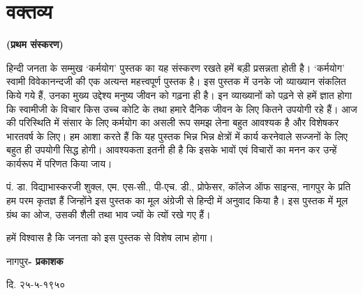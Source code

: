 
\chapter*{वक्तव्य}

\begin{center}
\textbf{(प्रथम संस्करण)}
\end{center}

हिन्दी जनता के सम्मुख ‘कर्मयोग’ पुस्तक का यह संस्करण रखते हमें बड़ी प्रसन्नता होती है। ‘कर्मयोग’ स्वामी विवेकानन्दजी की एक अत्यन्त महत्त्वपूर्ण पुस्तक है। इस पुस्तक में उनके जो व्याख्यान संकलित किये गये हैं, उनका मुख्य उद्देश्य मनुष्य जीवन को गढ़ना ही है। इन व्याख्यानों को पढ़ने से हमें ज्ञात होगा कि स्वामीजी के विचार किस उच्च कोटि के तथा हमारे दैनिक जीवन के लिए कितने उपयोगी रहे हैं। आज की परिस्थिति में संसार के लिए कर्मयोग का असली रूप समझ लेना बहुत आवश्यक है और विशेषकर भारतवर्ष के लिए। हम आशा करते हैं कि यह पुस्तक भिन्न भिन्न क्षेत्रों में कार्य करनेवाले सज्जनों के लिए बहुत ही उपयोगी सिद्ध होगी। आवश्यकता इतनी ही है कि इसके भावों एवं विचारों का मनन कर उन्हें कार्यरूप में परिणत किया जाय।

पं. डा. विद्याभास्करजी शुक्ल, एम. एस-सी., पी-एच. डी., प्रोफेसर, कॉलेज ऑफ साइन्स, नागपुर के प्रति हम परम कृतज्ञ हैं जिन्होंने इस पुस्तक का मूल अंग्रेजी से हिन्दी में अनुवाद किया है। इस पुस्तक में मूल ग्रंथ का ओज, उसकी शैली तथा भाव ज्यों के त्यों रखे गए हैं।

हमें विश्वास है कि जनता को इस पुस्तक से विशेष लाभ होगा।

\bigskip

\noindent नागपुर\hfill\textbf{- प्रकाशक}

\noindent दि. २५-५-१९५०


